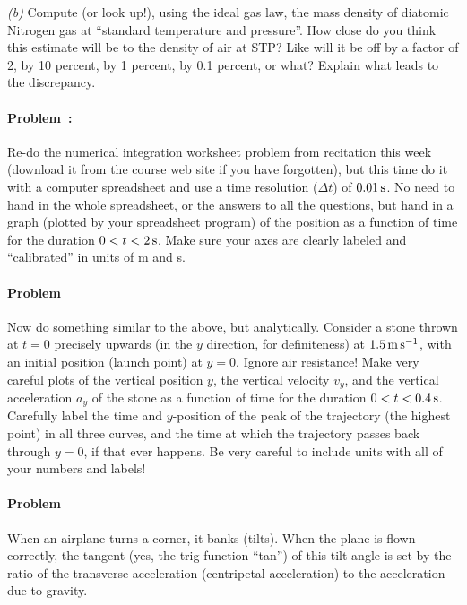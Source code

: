 \documentclass[12pt]{article}
\begin{document}
\textsl{(b)} Compute (or look up!), using the ideal gas law, the mass
density of diatomic Nitrogen gas at ``standard temperature and
pressure''. How close do you think this estimate will be to the
density of air at STP? Like will it be off by a factor of 2, by 10
percent, by 1 percent, by 0.1 percent, or what? Explain what leads
to the discrepancy.

\paragraph{Problem~\theproblem:}%
Re-do the numerical integration worksheet problem from recitation this
week (download it from the course web site if you have forgotten), but
this time do it with a computer spreadsheet and use a time resolution
($\Delta t$) of $0.01\,\mathrm{s}$.  No need to hand in the whole spreadsheet,
or the answers to all the questions, but hand in a graph (plotted by
your spreadsheet program) of the position as a function of time for
the duration $0<t<2\,\mathrm{s}$.  Make sure your axes are clearly labeled and
``calibrated'' in units of m and s.

\paragraph{Problem~\theproblem}%
Now do something similar to the above, but analytically.  Consider a
stone thrown at $t=0$ precisely upwards (in the $y$ direction, for
definiteness) at $1.5\,\mathrm{m}\,\mathrm{s}^{-1}$, with an initial position (launch point)
at $y=0$.  Ignore air resistance!  Make very careful plots of the
vertical position $y$, the vertical velocity $v_y$, and the vertical
acceleration $a_y$ of the stone as a function of time for the duration
$0<t<0.4\,\mathrm{s}$.  Carefully label the time and $y$-position of
the peak of the trajectory (the highest point) in all three curves,
and the time at which the trajectory passes back through $y=0$, if
that ever happens. Be very careful to include units with all of your
numbers and labels!

\paragraph{Problem~\theproblem}%
When an airplane turns a corner, it banks (tilts). When the plane is
flown correctly, the tangent (yes, the trig function ``tan'') of this
tilt angle is set by the ratio of the transverse acceleration
(centripetal acceleration) to the acceleration due to gravity.
\end{document}
